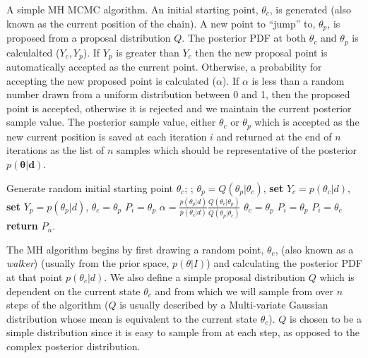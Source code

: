 \begin{algorithm}[hbt!]
\caption[A simple Markov Chain Monte Carlo algorithm]{A simple 
\ac{MH} \ac{MCMC} algorithm. An initial 
starting point, $\theta_c$, is generated (also 
known as the current position of the chain). A new point to ``jump'' to, 
$\theta_p$, is proposed from a proposal distribution $Q$. The 
posterior \ac{PDF} at both $\theta_c$ and $\theta_p$ is calculalted 
($Y_c,Y_p$). If $Y_p$ is greater than $Y_c$ then the new proposal 
point is automatically accepted as the current point. Otherwise, 
a probability for accepting the new proposed point is 
calculated ($\alpha$). If $\alpha$ is less than a random 
number drawn from a uniform distribution between 0 and 1, then 
the proposed point is accepted, otherwise it is rejected and 
we maintain the current posterior sample value. The posterior 
sample value, either $\theta_c$ or $\theta_p$ which is accepted 
as the new current position is saved at each iteration $i$ 
and returned at the end of $n$ iterations as the list of $n$ 
samples which should be representative of the posterior 
$p(\bm{\theta}|\bm{d})$.}\label{alg:MCMC}
\begin{algorithmic}
\State Generate random initial starting point $\theta_c$;
;
\State $\theta_{p} = Q(\theta_p|\theta_c)$,
\State \textbf{set} $Y_c = p(\theta_c|d)$,
\State \textbf{set} $Y_p = p(\theta_p|d)$, 
        \State $\theta_c = \theta_p$
        \State $P_i = \theta_p$
    \Else
        \State $\alpha = \frac{p(\theta_{p}|d)}{p(\theta_{c}|d)} \frac{Q(\theta_{c}|\theta_{p})}{Q(\theta_{p}|\theta_{c})}$
            \State $\theta_c = \theta_p$
            \State $P_i = \theta_p$
        \Else
            \State $P_i = \theta_c$
        \EndIf
    \EndIf
\EndFor
\State \textbf{return} $P_n$.
\end{algorithmic}
\end{algorithm}

The \ac{MH} algorithm begins by first drawing a random point, $\theta_c$, 
(also known as a \textit{walker}) (usually from the prior space, $p(\theta|I)$) 
and calculating the posterior \ac{PDF} 
at that point $p(\theta_{c}|d)$. We also define a simple  
proposal distribution $Q$ which is dependent on the  
current state $\theta_c$ and from which we will 
sample from over $n$ steps of the algorithm ($Q$ is usually 
described by a Multi-variate Gaussian distribution whose 
mean is equivalent to the current state $\theta_c$).
$Q$ is chosen to be a simple distribution since it is easy 
to sample from at each step, as opposed to the complex posterior distribution.

